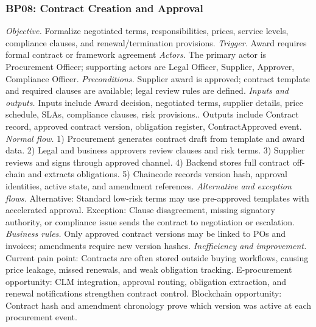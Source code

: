 \documentclass[conference]{IEEEtran}
\begin{document}
\subsubsection{BP08: Contract Creation and Approval}
\textit{Objective.} Formalize negotiated terms, responsibilities, prices, service levels, compliance clauses, and renewal/termination provisions.
\textit{Trigger.} Award requires formal contract or framework agreement
\textit{Actors.} The primary actor is Procurement Officer; supporting actors are Legal Officer, Supplier, Approver, Compliance Officer.
\textit{Preconditions.} Supplier award is approved; contract template and required clauses are available; legal review rules are defined.
\textit{Inputs and outputs.} Inputs include Award decision, negotiated terms, supplier details, price schedule, SLAs, compliance clauses, risk provisions.. Outputs include Contract record, approved contract version, obligation register, ContractApproved event.
\textit{Normal flow.} 1) Procurement generates contract draft from template and award data. 2) Legal and business approvers review clauses and risk terms. 3) Supplier reviews and signs through approved channel. 4) Backend stores full contract off-chain and extracts obligations. 5) Chaincode records version hash, approval identities, active state, and amendment references.
\textit{Alternative and exception flows.} Alternative: Standard low-risk terms may use pre-approved templates with accelerated approval. Exception: Clause disagreement, missing signatory authority, or compliance issue sends the contract to negotiation or escalation.
\textit{Business rules.} Only approved contract versions may be linked to POs and invoices; amendments require new version hashes.
\textit{Inefficiency and improvement.} Current pain point: Contracts are often stored outside buying workflows, causing price leakage, missed renewals, and weak obligation tracking. E-procurement opportunity: CLM integration, approval routing, obligation extraction, and renewal notifications strengthen contract control. Blockchain opportunity: Contract hash and amendment chronology prove which version was active at each procurement event.
\end{document}
